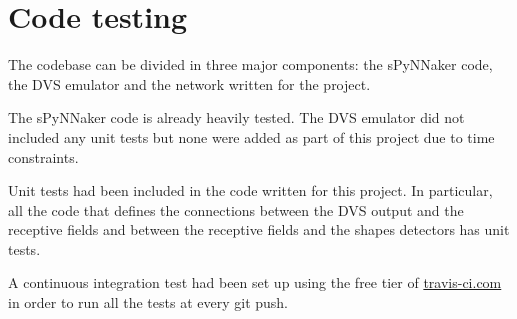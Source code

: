 \section{Code testing}
The codebase can be divided in three major components: the sPyNNaker code, the DVS emulator and the network written for the project. 

The sPyNNaker code is already heavily tested. The DVS emulator did not included any unit tests but none were added as part of this project due to time constraints. 

Unit tests had been included in the code written for this project. In particular, all the code that defines the connections between the DVS output and the receptive fields and between the receptive fields and the shapes detectors has unit tests. 

A continuous integration test had been set up using the free tier of \href{http://travis-ci.com}{travis-ci.com} in order to run all the tests at every git push. 